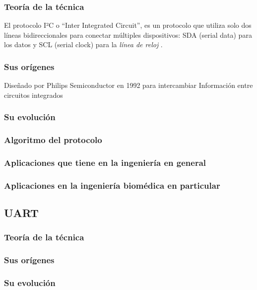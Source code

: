 \documentclass[conference]{IEEEtran}
\begin{document}
  \subsubsection{Teoría de la técnica}
    El protocolo I²C o ``Inter Integrated Circuit'', es un protocolo que utiliza solo dos líneas bidireccionales para conectar múltiples dispositivos: SDA (serial data) para los datos y SCL (serial clock) para la \textit{línea de reloj} \cite{legaspi2021i2c}. 

  \subsubsection{Sus orígenes}
    Diseñado por Philips Semiconductor en 1992 para intercambiar Información entre circuitos integrados \cite{cristina2014implementacion}
  \subsubsection{Su evolución}
  \subsubsection{Algoritmo del protocolo}
  \subsubsection{Aplicaciones que tiene en la ingeniería en general}
  \subsubsection{Aplicaciones en la ingeniería biomédica en particular}


\subsection{UART}
  \subsubsection{Teoría de la técnica}
  \subsubsection{Sus orígenes}
  \subsubsection{Su evolución}
\end{document}
